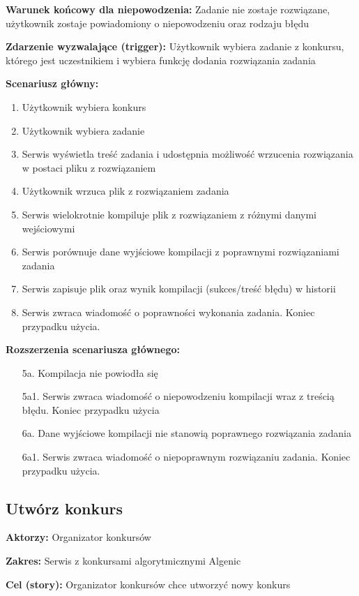 \documentclass{article}
\begin{document}
\textbf{Warunek końcowy dla niepowodzenia:} Zadanie nie zostaje rozwiązane, użytkownik zostaje powiadomiony o niepowodzeniu oraz rodzaju błędu

\textbf{Zdarzenie wyzwalające (trigger):} Użytkownik wybiera zadanie z konkursu, którego jest uczestnikiem i wybiera funkcję dodania rozwiązania zadania

\textbf{Scenariusz główny:}
\begin{enumerate}
	\item Użytkownik wybiera konkurs
	\item Użytkownik wybiera zadanie
	\item Serwis wyświetla treść zadania i udostępnia możliwość wrzucenia rozwiązania w postaci pliku z rozwiązaniem
	\item Użytkownik wrzuca plik z rozwiązaniem zadania
	\item Serwis wielokrotnie kompiluje plik z rozwiązaniem z różnymi danymi wejściowymi
	\item Serwis porównuje dane wyjściowe kompilacji z poprawnymi rozwiązaniami zadania
	\item Serwis zapisuje plik oraz wynik kompilacji (sukces/treść błędu) w historii
	\item Serwis zwraca wiadomość o poprawności wykonania zadania. Koniec przypadku użycia.
\end{enumerate}

\textbf{Rozszerzenia scenariusza głównego:}
\begin{itemize}
	\item[5a.] Kompilacja nie powiodła się
	\item[5a1.] Serwis zwraca wiadomość o niepowodzeniu kompilacji wraz z treścią błędu. Koniec przypadku użycia
	\item[6a.] Dane wyjściowe kompilacji nie stanowią poprawnego rozwiązania zadania
	\item[6a1.] Serwis zwraca wiadomość o niepoprawnym rozwiązaniu zadania. Koniec przypadku użycia.
\end{itemize}

\newpage
\subsection{Utwórz konkurs}

\textbf{Aktorzy:} Organizator konkursów

\textbf{Zakres:} Serwis z konkursami algorytmicznymi Algenic

\textbf{Cel (story):} Organizator konkursów chce utworzyć nowy konkurs
\end{document}
